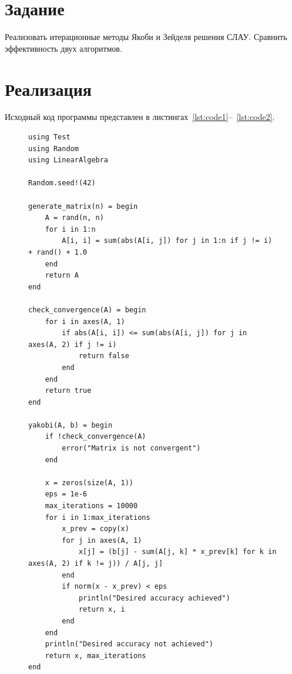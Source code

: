 \documentclass[a4paper, 14pt]{extarticle}
\begin{document}
\renewcommand{\ttdefault}{pcr}

\setlength{\tabcolsep}{3pt}
\newpage
\setcounter{page}{2}

\section{Задание}\label{Sect::task}

Реализовать итерационные методы Якоби и Зейделя решения СЛАУ. Сравнить
эффективность двух алгоритмов.

\section{Реализация}\label{Sect::impl}

Исходный код программы представлен в листингах~\ref{lst:code1}--~\ref{lst:code2}.

\begin{figure}[!htb]
\begin{lstlisting}[language={},caption={Методы Якоби и Зейделя решения СЛАУ},label={lst:code1}]
using Test
using Random
using LinearAlgebra

Random.seed!(42)

generate_matrix(n) = begin
    A = rand(n, n)
    for i in 1:n
        A[i, i] = sum(abs(A[i, j]) for j in 1:n if j != i) + rand() + 1.0
    end
    return A
end

check_convergence(A) = begin
    for i in axes(A, 1)
        if abs(A[i, i]) <= sum(abs(A[i, j]) for j in axes(A, 2) if j != i)
            return false
        end
    end
    return true
end

yakobi(A, b) = begin
    if !check_convergence(A)
        error("Matrix is not convergent")
    end

    x = zeros(size(A, 1))
    eps = 1e-6
    max_iterations = 10000
    for i in 1:max_iterations
        x_prev = copy(x)
        for j in axes(A, 1)
            x[j] = (b[j] - sum(A[j, k] * x_prev[k] for k in axes(A, 2) if k != j)) / A[j, j]
        end
        if norm(x - x_prev) < eps
            println("Desired accuracy achieved")
            return x, i
        end
    end
    println("Desired accuracy not achieved")
    return x, max_iterations
end

\end{lstlisting}
\end{figure}

\end{document}
